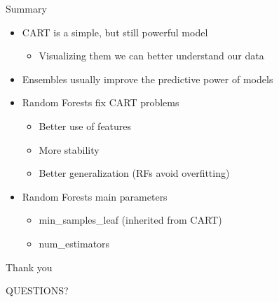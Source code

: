 \begin{frame}[fragile]{Summary}
    \begin{itemize}
        \item CART is a simple, but still powerful model
        \begin{itemize}
            \item Visualizing them we can better understand our data
        \end{itemize}
        \item Ensembles usually improve the predictive power of models
        \item Random Forests fix CART problems
        \begin{itemize}
            \item Better use of features
            \item More stability
            \item Better generalization (RFs avoid overfitting)
        \end{itemize}
        \item Random Forests main parameters
        \begin{itemize}
            \item min\_samples\_leaf (inherited from CART)
            \item num\_estimators
        \end{itemize}

    \end{itemize}

\end{frame}

\begin{frame}[fragile]{Thank you}
    \begin{center}
        \Large
        QUESTIONS?
    \end{center}

\end{frame}





